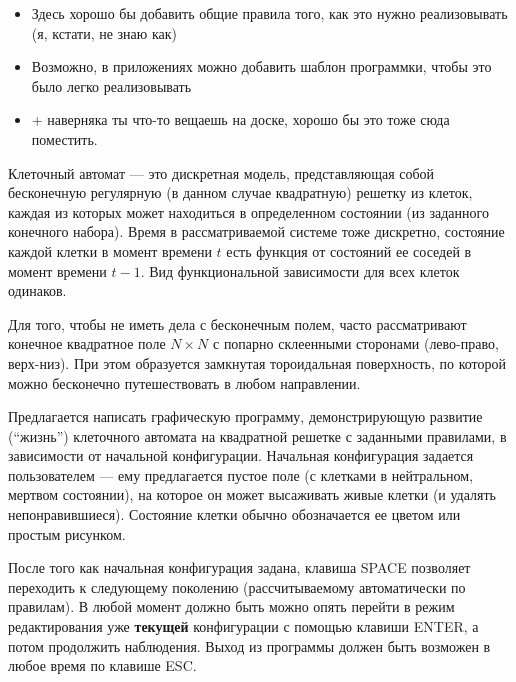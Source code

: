 \begin{itemize}
    \item Здесь хорошо бы добавить общие правила того, как это нужно реализовывать (я, кстати, не знаю как)
    \item Возможно, в приложениях можно добавить шаблон программки, чтобы это было легко реализовывать
    \item + наверняка ты что-то вещаешь на доске, хорошо бы это тоже сюда поместить.
\end{itemize}
Клеточный автомат --- это дискретная модель, представляющая собой бесконечную 
регулярную (в данном случае квадратную) решетку из клеток, каждая из которых 
может находиться в определенном состоянии (из заданного конечного набора). 
Время в рассматриваемой системе тоже 
дискретно, состояние каждой клетки в момент времени $t$ есть функция от 
состояний ее соседей в момент времени $t-1$. Вид функциональной зависимости для
всех клеток одинаков.

Для того, чтобы не иметь дела с бесконечным полем, часто рассматривают конечное
квадратное поле \mbox{$N\times N$} с попарно склеенными сторонами (лево-право, верх-низ).
При этом образуется замкнутая тороидальная поверхность, по которой можно 
бесконечно путешествовать в любом направлении.

Предлагается написать графическую программу, демонстрирующую развитие (``жизнь'')
клеточного автомата на квадратной решетке с заданными правилами, в 
зависимости от начальной конфигурации. Начальная конфигурация задается 
пользователем --- ему предлагается пустое поле (с клетками в нейтральном, 
мертвом состоянии), на которое он может высаживать живые клетки (и удалять 
непонравившиеся). Состояние клетки обычно обозначается ее цветом или простым
рисунком.

После того как начальная конфигурация задана, клавиша SPACE 
позволяет переходить к следующему поколению (рассчитываемому автоматически 
по правилам). В любой момент должно быть можно опять перейти в режим 
редактирования уже \textbf{текущей} конфигурации с помощью клавиши ENTER, а 
потом продолжить наблюдения. Выход из программы должен быть возможен в любое время
по клавише ESC.

